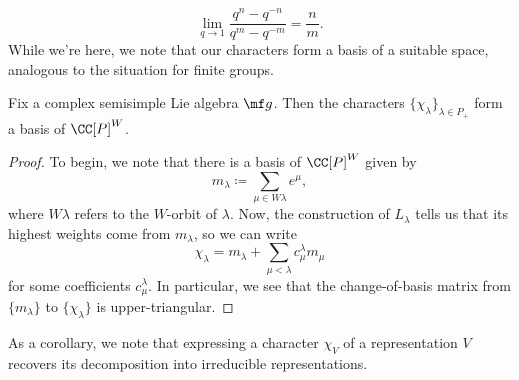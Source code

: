 \documentclass[../notes.tex]{subfiles}
\begin{document}
\[\lim_{q\to1}\frac{q^n-q^{-n}}{q^m-q^{-m}}=\frac nm.\]
While we're here, we note that our characters form a basis of a suitable space, analogous to the situation for finite groups.
\begin{theorem}
	Fix a complex semisimple Lie algebra $\mf g$. Then the characters $\{\chi_\lambda\}_{\lambda\in P_+}$  form a basis of $\CC[P]^W$.
\end{theorem}
\begin{proof}
	To begin, we note that there is a basis of $\CC[P]^W$ given by
	\[m_\lambda\coloneqq\sum_{\mu\in W\lambda}e^\mu,\]
	where $W\lambda$ refers to the $W$-orbit of $\lambda$. Now, the construction of $L_\lambda$ tells us that its highest weights come from $m_\lambda$, so we can write
	\[\chi_\lambda=m_\lambda+\sum_{\mu<\lambda}c_\mu^\lambda m_\mu\]
	for some coefficients $c_\mu^\lambda$. In particular, we see that the change-of-basis matrix from $\{m_\lambda\}$ to $\{\chi_\lambda\}$ is upper-triangular.
\end{proof}
\begin{remark}
	As a corollary, we note that expressing a character $\chi_V$ of a representation $V$ recovers its decomposition into irreducible representations.
\end{remark}
\end{document}
